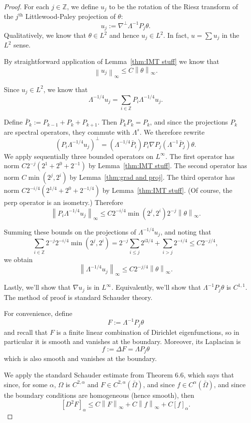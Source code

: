 \documentclass[11pt]{amsart}
\theoremstyle{remark}
\theoremstyle{definition}
\newcommand{\Z}{\mathbb{Z}}
\newcommand{\norm}[1]{\left\lVert#1\right\rVert}
\newcommand{\paren}[1]{\left( #1 \right)}
\newcommand{\bracket}[1]{\left[ #1 \right]}
\newcommand{\grad}{\nabla}
\newcommand{\Laplace}{\Delta}
\newcommand{\ith}{^\mathrm{th}}
\begin{document}
\begin{proof}
For each $j \in \Z$, we define $u_j$ to be the rotation of the Riesz transform of the $j\ith$ Littlewood-Paley projection of $\theta$:
\[ u_j := \grad^\perp \Lambda^{-1} P_j \theta. \]
Qualitatively, we know that $\theta \in L^2$ and hence $u_j \in L^2$.  In fact, $u = \sum u_j$ in the $L^2$ sense.  

By straightforward application of Lemma~\ref{thm:IMT stuff} we know that
\[ \norm{u_j}_\infty \leq C \norm{\theta}_\infty. \]

Since $u_j \in L^2$, we know that
\[ \Lambda^{-1/4} u_j = \sum_{i \in \Z} P_i \Lambda^{-1/4} u_j. \]

Define $\bar{P}_k := P_{k-1} + P_k + P_{k+1}$.  Then $\bar{P}_k P_k = P_k$, and since the projections $P_k$ are spectral operators, they commute with $\Lambda^s$.  We therefore rewrite
\[ \paren{P_i \Lambda^{-1/4} u_j}^\perp = \paren{\Lambda^{-1/4} \bar{P}_i} P_i \grad P_j \paren{\Lambda^{-1} \bar{P}_j} \theta. \]
We apply sequentially three bounded operators on $L^\infty$.  The first operator has norm $C 2^{-j}(2^{1}+2^0+2^{-1})$ by Lemma~\ref{thm:IMT stuff}.  The second operator has norm $C \min(2^j, 2^i)$ by Lemma~\ref{thm:grad and proj}.  The third operator has norm $C 2^{-i/4}(2^{1/4} + 2^0 + 2^{-1/4})$ by Lemma~\ref{thm:IMT stuff}.  (Of course, the perp operator is an isometry.)  Therefore
\[ \norm{ P_i \Lambda^{-1/4} u_j}_\infty \leq C 2^{-i/4} \min(2^j, 2^i) 2^{-j} \norm{\theta}_\infty. \]

Summing these bounds on the projections of $\Lambda^{-1/4} u_j$, and noting that
\[ \sum_{i \in \Z} 2^{-j} 2^{-i/4} \min(2^j,2^i) = 2^{-j} \sum_{i \leq j} 2^{i 3/4} + \sum_{i>j} 2^{-i/4} \leq C 2^{-j/4}, \]
we obtain
\[ \norm{\Lambda^{-1/4} u_j}_\infty \leq C 2^{-j/4} \norm{\theta}_\infty. \]

Lastly, we'll show that $\grad u_j$ is in $L^\infty$.  Equivalently, we'll show that $\Lambda^{-1} P_j \theta$ is $C^{1,1}$.  The method of proof is standard Schauder theory.  

For convenience, define 
\[ F := \Lambda^{-1} P_j \theta \]
and recall that $F$ is a finite linear combination of Dirichlet eigenfunctions, so in particular it is smooth and vanishes at the boundary.  Moreover, its Laplacian is 
\[ f := \Laplace F = \Lambda P_j \theta \]
which is also smooth and vanishes at the boundary.

We apply the standard Schauder estimate from \cite{gt} Theorem 6.6, which says that since, for some $\alpha$, $\Omega$ is $C^{2,\alpha}$ and $F \in C^{2,\alpha}(\bar{\Omega})$, and since $f \in C^\alpha(\bar{\Omega})$, and since the boundary conditions are homogeneous (hence smooth), then
\[ \bracket{D^2 F}_{\alpha} \leq C \norm{F}_\infty + C \norm{f}_\infty + C \bracket{f}_{\alpha}. \]


\end{proof}
\end{document}
